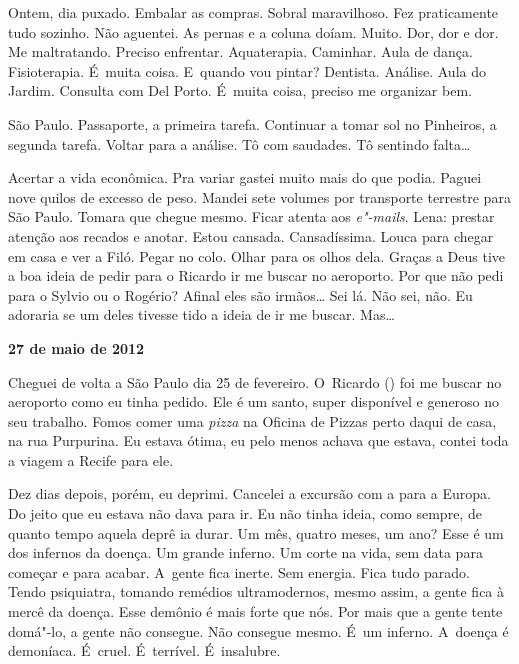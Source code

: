 Ontem, dia puxado. Embalar as compras. Sobral maravilhoso. Fez
praticamente tudo sozinho. Não aguentei. As pernas e a coluna doíam.
Muito. Dor, dor e dor. Me maltratando. Preciso enfrentar. Aquaterapia.
Caminhar. Aula de dança. Fisioterapia. É~muita coisa. E~quando vou
pintar? Dentista. Análise. Aula do Jardim. Consulta com Del Porto. É~muita coisa, preciso me organizar bem.

São Paulo. Passaporte, a primeira tarefa. Continuar a tomar sol no
Pinheiros, a segunda tarefa. Voltar para a análise. Tô com saudades. Tô
sentindo falta…

Acertar a vida econômica. Pra variar gastei muito mais do que podia.
Paguei nove quilos de excesso de peso. Mandei sete volumes por
transporte terrestre para São Paulo. Tomara que chegue mesmo. Ficar
atenta aos \emph{e"-mails}. Lena: prestar atenção aos recados e anotar.
Estou cansada. Cansadíssima. Louca para chegar em casa e ver a Filó.
Pegar no colo. Olhar para os olhos dela. Graças a Deus tive a boa ideia
de pedir para o Ricardo ir me buscar no aeroporto. Por que não pedi para
o Sylvio ou o Rogério? Afinal eles são irmãos… Sei lá. Não sei,
não. Eu adoraria se um deles tivesse tido a ideia de ir me buscar.
Mas…

\begin{center}\asterisc{}\end{center}


\begin{flushright}\textbf{27 de maio de 2012}\end{flushright}


Cheguei de volta a São Paulo dia 25 de fevereiro. O~Ricardo () foi me
buscar no aeroporto como eu tinha pedido. Ele é um santo, super
disponível e generoso no seu trabalho. Fomos comer uma \emph{pizza} na
Oficina de Pizzas perto daqui de casa, na rua Purpurina. Eu estava
ótima, eu pelo menos achava que estava, contei toda a viagem a Recife
para ele.

Dez dias depois, porém, eu deprimi. Cancelei a excursão com a  para a
Europa. Do jeito que eu estava não dava para ir. Eu não tinha ideia,
como sempre, de quanto tempo aquela deprê ia durar. Um mês, quatro
meses, um ano? Esse é um dos infernos da doença. Um grande inferno. Um
corte na vida, sem data para começar e para acabar. A~gente fica inerte.
Sem energia. Fica tudo parado. Tendo psiquiatra, tomando remédios
ultramodernos, mesmo assim, a gente fica à mercê da doença. Esse demônio
é mais forte que nós. Por mais que a gente tente domá"-lo, a gente não
consegue. Não consegue mesmo. É~um inferno. A~doença é demoníaca. É~cruel. É~terrível. É~insalubre.

